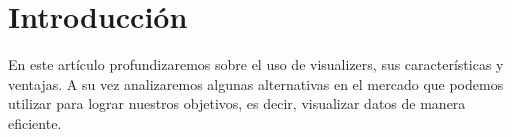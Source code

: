 \section{Introducción}
En este artículo profundizaremos sobre el uso de visualizers,
sus características y ventajas. A su vez analizaremos algunas
alternativas en el mercado que podemos utilizar para lograr
nuestros objetivos, es decir, visualizar datos de manera eficiente.
